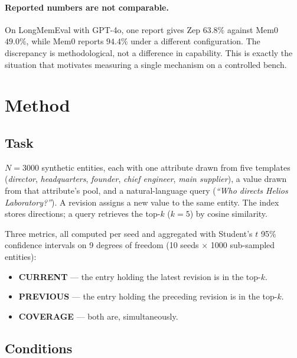 \documentclass[11pt,a4paper]{article}
\begin{document}
\paragraph{Reported numbers are not comparable.} On LongMemEval with GPT-4o, one report gives Zep
$63.8\%$ against Mem0 $49.0\%$, while Mem0 reports $94.4\%$ under a different configuration. The
discrepancy is methodological, not a difference in capability. This is exactly the situation that
motivates measuring a single mechanism on a controlled bench.

\section{Method}
\label{sec:method}

\subsection{Task}

$N = 3000$ synthetic entities, each with one attribute drawn from five templates
(\emph{director}, \emph{headquarters}, \emph{founder}, \emph{chief engineer},
\emph{main supplier}), a value drawn from that attribute's pool, and a natural-language query
(\emph{``Who directs Helios Laboratory?''}). A revision assigns a new value to the same entity. The
index stores directions; a query retrieves the top-$k$ ($k=5$) by cosine similarity.

Three metrics, all computed per seed and aggregated with Student's $t$ 95\% confidence intervals on
9 degrees of freedom (10 seeds $\times$ 1000 sub-sampled entities):

\begin{itemize}
\item \textbf{CURRENT} --- the entry holding the latest revision is in the top-$k$.
\item \textbf{PREVIOUS} --- the entry holding the preceding revision is in the top-$k$.
\item \textbf{COVERAGE} --- both are, simultaneously.
\end{itemize}

\subsection{Conditions}
\end{document}
